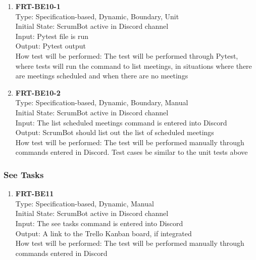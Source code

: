 \documentclass[12pt, titlepage]{article}
\begin{document}
\begin{enumerate}
    \item{\textbf{FRT-BE10-1}}\\
    Type: Specification-based, Dynamic, Boundary, Unit\\
    Initial State: ScrumBot active in Discord channel\\
    Input: Pytest file is run\\
    Output: Pytest output\\
    How test will be performed: The test will be performed through Pytest, where tests will run the command to list meetings, in situations where there are meetings scheduled and when there are no meetings\\
    
    \item{\textbf{FRT-BE10-2}}\\
    Type: Specification-based, Dynamic, Boundary, Manual\\
    Initial State: ScrumBot active in Discord channel\\
    Input: The list scheduled meetings command is entered into Discord\\
    Output: ScrumBot should list out the list of scheduled meetings\\
    How test will be performed: The test will be performed manually through commands entered in Discord. Test cases be similar to the unit tests above\\
\end{enumerate}

\subsubsection{See Tasks}

\begin{enumerate}
    \item{\textbf{FRT-BE11}}\\
    Type: Specification-based, Dynamic, Manual\\
    Initial State: ScrumBot active in Discord channel\\
    Input: The see tasks command is entered into Discord\\
    Output: A link to the Trello Kanban board, if integrated\\
    How test will be performed: The test will be performed manually through commands entered in Discord\\
\end{enumerate}
\end{document}
